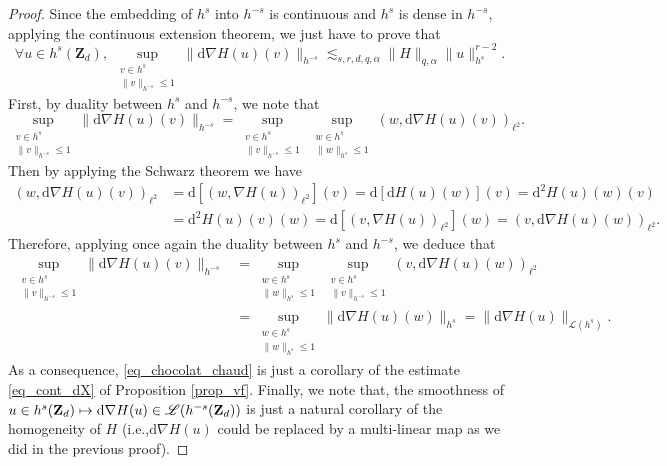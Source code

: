 \documentclass[11pt]{article}
\newcommand{\ie}{i.e.,\xspace}
\newcommand\mto{\mathchoice{\longmapsto}{\mapsto}{\mapsto}{\mapsto}}
\theoremstyle{definition}
\begin{document}
\begin{proof}
Since the embedding of $h^s$ into $h^{-s}$ is continuous and $h^s$ is dense in $h^{-s}$, applying the continuous extension theorem, we just have to prove that
\begin{equation}
\label{eq_chocolat_chaud}
\forall u \in h^s(\mathbf{Z}_d), \ \sup_{\substack{v\in h^s \\ \| v\|_{h^{-s}}\leq 1}} \| \mathrm{d}\nabla H(u)(v) \|_{h^{-s}} \lesssim_{s,r,d,q,\alpha} \| H \|_{q,\alpha} \|u\|_{h^s}^{r-2}.
\end{equation}
First, by duality between $h^s$ and $h^{-s}$, we note that
\[
\sup_{\substack{v\in h^s \\ \| v\|_{h^{-s}}\leq 1}} \| \mathrm{d}\nabla H(u)(v) \|_{h^{-s}} = \sup_{\substack{v\in h^s \\ \| v\|_{h^{-s}}\leq 1}} \sup_{\substack{w\in h^s \\ \| w\|_{h^{s}}\leq 1}} (w, \mathrm{d} \nabla H(u)(v))_{\ell^2}.
\]
Then by applying the Schwarz theorem we have
\begin{align*}
(w, \mathrm{d} \nabla H(u)(v))_{\ell^2} &= \mathrm{d}[(w,\nabla H(u))_{\ell^2}](v) = \mathrm{d}[\mathrm{d} H(u)(w)](v) = \mathrm{d}^2 H(u)(w)(v) \\
&= \mathrm{d}^2 H(u)(v)(w) = \mathrm{d}[(v, \nabla H(u))_{\ell^2}](w) = (v, \mathrm{d} \nabla H(u)(w))_{\ell^2}.
\end{align*}
Therefore, applying once again the duality between $h^s$ and $h^{-s}$, we deduce that
\begin{equation*}
\begin{split}
\sup_{\substack{v\in h^s \\ \| v\|_{h^{-s}}\leq 1}} \| \mathrm{d} \nabla H(u)(v) \|_{h^{-s}} &= \! \! \sup_{\substack{w\in h^s \\ \| w\|_{h^{s}}\leq 1}} \sup_{\substack{v\in h^s \\ \| v\|_{h^{-s}}\leq 1}} (v, \mathrm{d} \nabla H(u)(w))_{\ell^2} \\ &= \! \! \sup_{\substack{w\in h^s \\ \| w\|_{h^{s}}\leq 1}} \| \mathrm{d} \nabla H(u)(w) \|_{h^{s}}
= \|\mathrm{d} \nabla H(u)\|_{\mathscr{L}(h^s)}.
\end{split}
\end{equation*}
As a consequence, \eqref{eq_chocolat_chaud} is just a corollary of the estimate \eqref{eq_cont_dX} of Proposition \ref{prop_vf}. Finally, we note that, the smoothness of $u\in h^s(\mathbf{Z}_d) \mto \mathrm{d}\nabla H(u) \in \mathscr{L}(h^{-s}(\mathbf{Z}_d))$ is just a natural corollary of the homogeneity of $H$ (\ie $\mathrm{d}\nabla H(u)$ could be replaced by a multi-linear map as we did in the previous proof).
\end{proof}
\end{document}
